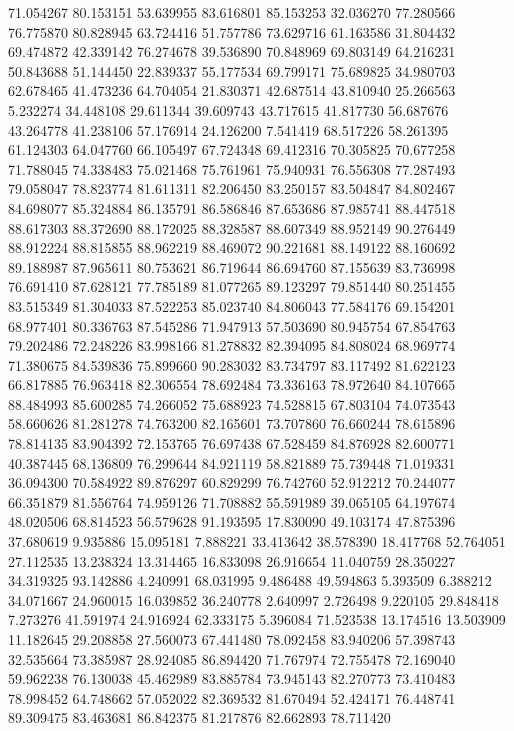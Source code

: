 71.054267
80.153151
53.639955
83.616801
85.153253
32.036270
77.280566
76.775870
80.828945
63.724416
51.757786
73.629716
61.163586
31.804432
69.474872
42.339142
76.274678
39.536890
70.848969
69.803149
64.216231
50.843688
51.144450
22.839337
55.177534
69.799171
75.689825
34.980703
62.678465
41.473236
64.704054
21.830371
42.687514
43.810940
25.266563
5.232274
34.448108
29.611344
39.609743
43.717615
41.817730
56.687676
43.264778
41.238106
57.176914
24.126200
7.541419
68.517226
58.261395
61.124303
64.047760
66.105497
67.724348
69.412316
70.305825
70.677258
71.788045
74.338483
75.021468
75.761961
75.940931
76.556308
77.287493
79.058047
78.823774
81.611311
82.206450
83.250157
83.504847
84.802467
84.698077
85.324884
86.135791
86.586846
87.653686
87.985741
88.447518
88.617303
88.372690
88.172025
88.328587
88.607349
88.952149
90.276449
88.912224
88.815855
88.962219
88.469072
90.221681
88.149122
88.160692
89.188987
87.965611
80.753621
86.719644
86.694760
87.155639
83.736998
76.691410
87.628121
77.785189
81.077265
89.123297
79.851440
80.251455
83.515349
81.304033
87.522253
85.023740
84.806043
77.584176
69.154201
68.977401
80.336763
87.545286
71.947913
57.503690
80.945754
67.854763
79.202486
72.248226
83.998166
81.278832
82.394095
84.808024
68.969774
71.380675
84.539836
75.899660
90.283032
83.734797
83.117492
81.622123
66.817885
76.963418
82.306554
78.692484
73.336163
78.972640
84.107665
88.484993
85.600285
74.266052
75.688923
74.528815
67.803104
74.073543
58.660626
81.281278
74.763200
82.165601
73.707860
76.660244
78.615896
78.814135
83.904392
72.153765
76.697438
67.528459
84.876928
82.600771
40.387445
68.136809
76.299644
84.921119
58.821889
75.739448
71.019331
36.094300
70.584922
89.876297
60.829299
76.742760
52.912212
70.244077
66.351879
81.556764
74.959126
71.708882
55.591989
39.065105
64.197674
48.020506
68.814523
56.579628
91.193595
17.830090
49.103174
47.875396
37.680619
9.935886
15.095181
7.888221
33.413642
38.578390
18.417768
52.764051
27.112535
13.238324
13.314465
16.833098
26.916654
11.040759
28.350227
34.319325
93.142886
4.240991
68.031995
9.486488
49.594863
5.393509
6.388212
34.071667
24.960015
16.039852
36.240778
2.640997
2.726498
9.220105
29.848418
7.273276
41.591974
24.916924
62.333175
5.396084
71.523538
13.174516
13.503909
11.182645
29.208858
27.560073
67.441480
78.092458
83.940206
57.398743
32.535664
73.385987
28.924085
86.894420
71.767974
72.755478
72.169040
59.962238
76.130038
45.462989
83.885784
73.945143
82.270773
73.410483
78.998452
64.748662
57.052022
82.369532
81.670494
52.424171
76.448741
89.309475
83.463681
86.842375
81.217876
82.662893
78.711420
